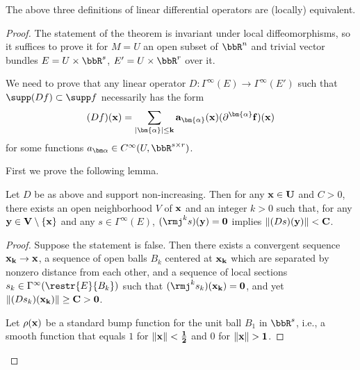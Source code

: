 \begin{thm}
    The above three definitions of linear differential operators are (locally) equivalent.
\end{thm}
\begin{proof}
    The statement of the theorem is invariant under local diffeomorphisms, so it suffices to prove it for $M=U$ an open subset of $\bbR^n$ and trivial vector bundles $E=U\times\bbR^s$, $E'=U\times\bbR^r$ over it.

    We need to prove that any linear operator $D:\Gamma^\infty(E)\to \Gamma^\infty(E')$ such that $\supp (Df)\subset \supp f$ necessarily has the form 
    \[(Df)(\bf{x})=\sum_{|\bm{\alpha}|\leq k}a_{\bm{\alpha}}(\bf{x})(\partial^{\bm{\alpha}}f)(\bf{x})\]
    for some functions $a_{\bm\alpha}\in C^\infty(U,\bbR^{s\times r})$.

    First we prove the following lemma.
    \begin{lem}
        Let $D$ be as above and support non-increasing. Then for any $\bf{x}\in U$ and $C>0$, there exists an open neighborhood $V$ of $\bf{x}$ and an integer $k>0$ such that, for any $\bf{y}\in V\setminus\{\bf{x}\}$ and any $s\in\Gamma^\infty(E)$, $(\rmj^ks)(\bf{y})=0$ implies $\lVert (Ds)(\bf{y})\rVert<C$.
    \end{lem}
    \begin{proof}
        Suppose the statement is false. Then there exists a convergent sequence $\bf{x}_k\to \bf{x}$, a sequence of open balls $B_k$ centered at $\bf{x}_k$ which are separated by nonzero distance from each other, and a sequence of local sections $s_k\in\Gamma^\infty(\restr{E}{B_k})$ such that $(\rmj^ks_k)(\bf{x}_k)=0$, and yet $\lVert(Ds_k)(\bf{x}_k)\rVert\geq C>0$.

        Let $\rho(\bf{x})$ be a standard bump function for the unit ball $B_1$ in $\bbR^s$, i.e., a smooth function that equals $1$ for $\lVert\bf{x}\rVert<\frac12$ and $0$ for $\lVert\bf{x}\rVert>1$.


\end{proof}
\end{proof}
